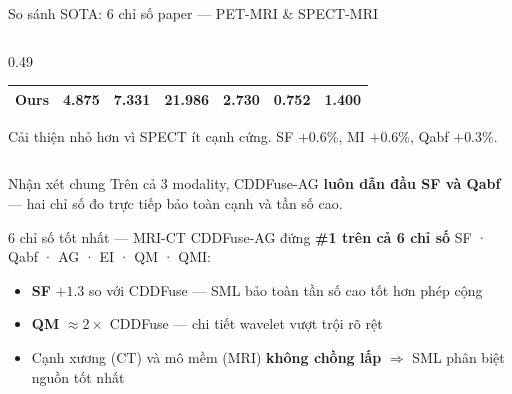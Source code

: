 \documentclass[t, aspectratio=169]{beamer}
\begin{document}
\begin{frame}{So sánh SOTA: 6 chỉ số paper --- PET-MRI \& SPECT-MRI}
\begin{columns}[T]
\begin{column}{0.49\textwidth}
{\begin{tabular}{lcccccc}
                \midrule
                \rowcolor{red!12}
                \textbf{Ours} & 4.875 & 7.331 & \textbf{21.986} & \textbf{2.730} & \textbf{0.752} & 1.400 \\
                \bottomrule
            \end{tabular}}
            \vspace{0.2em}
            \small Cải thiện nhỏ hơn vì SPECT ít cạnh cứng. SF $+0.6\%$, MI $+0.6\%$, Qabf $+0.3\%$.
        \end{column}
    \end{columns}
    \vspace{0.3em}
    \begin{alertblock}{\small Nhận xét chung}
        \centering\small Trên cả 3 modality, CDDFuse-AG \textbf{luôn dẫn đầu SF và Qabf} --- hai chỉ số đo trực tiếp bảo toàn cạnh và tần số cao.
    \end{alertblock}
\end{frame}

\begin{frame}{6 chỉ số tốt nhất --- MRI-CT}
    CDDFuse-AG đứng \textbf{\#1 trên cả 6 chỉ số} SF · Qabf · AG · EI · QM · QMI:
    \vspace{0.2em}
    \vspace{0.3em}
    \begin{itemize}
        \item \textbf{SF} $+1.3$ so với CDDFuse --- SML bảo toàn tần số cao tốt hơn phép cộng
        \item \textbf{QM} $\approx 2\times$ CDDFuse --- chi tiết wavelet vượt trội rõ rệt
        \item Cạnh xương (CT) và mô mềm (MRI) \textbf{không chồng lấp} $\Rightarrow$ SML phân biệt nguồn tốt nhất
    \end{itemize}
\end{frame}
\end{document}
